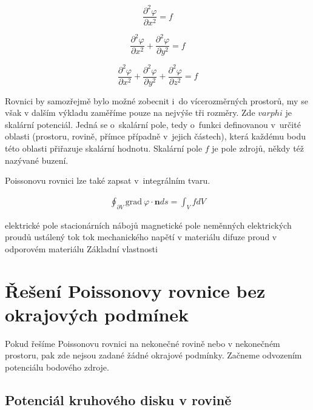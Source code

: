 \documentclass{book}
\newcommand{\vect}[1]{\boldsymbol{#1}}
\newcommand{\grad}{\mathrm{grad}}
\begin{document}
\begin{equation}
\label{eq:poissonova_rovnice_primka}
\frac{\partial^2 \varphi}{\partial x^2} = f
\end{equation}

\begin{equation}
\label{eq:poissonova_rovnice_rovina}
\frac{\partial^2 \varphi}{\partial x^2} + \frac{\partial^2 \varphi}{\partial y^2} = f
\end{equation}

\begin{equation}
\label{eq:poissonova_rovnice_prostor}
\frac{\partial^2 \varphi}{\partial x^2} + \frac{\partial^2 \varphi}{\partial y^2} + \frac{\partial^2 \varphi}{\partial z^2} = f
\end{equation}

Rovnici by samozřejmě bylo možné zobecnit i~do vícerozměrných prostorů, my se však v dalším výkladu zaměříme pouze na nejvýše tři rozměry.
Zde \(varphi\) je skalární potenciál. Jedná se o~skalární pole, tedy o~funkci definovanou v~určité oblasti (prostoru, rovině, přímce případně v~jejich částech), která každému bodu této oblasti přiřazuje skalární
hodnotu. Skalární pole \(f\) je pole zdrojů, někdy též nazývané buzení.

Poissonovu rovnici lze také zapsat v~integrálním tvaru.

\begin{equation}
\label{eq:poissonova_rovnice_integralni_tvar}
\begin{split}
\oint_{\partial V} \grad \ \varphi \cdot \vect{n} ds = \int_V f dV
\end{split}
\end{equation}


elektrické pole stacionárních nábojů
magnetické pole neměnných elektrických proudů
ustálený tok
tok mechanického napětí v materiálu
difuze
proud v odporovém materiálu
Základní vlastnosti


\chapter{Řešení Poissonovy rovnice bez okrajových podmínek}

Pokud řešíme Poissonovu rovnici na nekonečné rovině nebo v nekonečném prostoru, pak zde nejsou zadané žádné okrajové podmínky. Začneme odvozením
potenciálu bodového zdroje.

\section{Potenciál kruhového disku v rovině}
\end{document}

